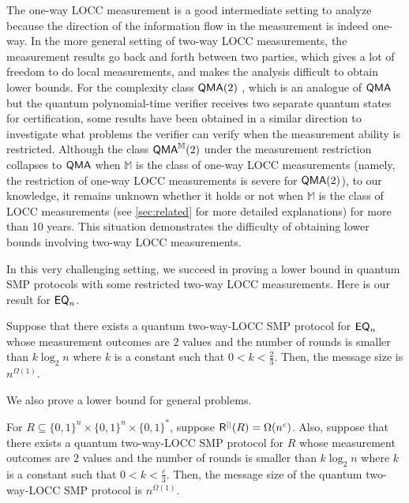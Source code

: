 The one-way LOCC measurement is a good intermediate setting to analyze because the direction of the information flow in the measurement is indeed one-way. In the more general setting of two-way LOCC measurements, the measurement results go back and forth between two parties, which gives a lot of freedom to do local measurements, and makes the analysis difficult to obtain lower bounds. For the complexity class $\mathsf{QMA}(2)$ \cite{KMY03,HM13}, which is an analogue of $\mathsf{QMA}$ but the quantum polynomial-time verifier receives two separate quantum states for certification, some results have been obtained in a similar direction to investigate what problems the verifier can verify when the measurement ability is restricted. Although the class $\mathsf{QMA}^{\mathbb{M}}(2)$ under the measurement restriction collapses to $\mathsf{QMA}$ when $\mathbb{M}$ is the class of one-way LOCC measurements \cite{BCY11,LS15} (namely, the restriction of one-way LOCC measurements is severe for $\mathsf{QMA}(2)$), to our knowledge, it remains unknown whether it holds or not when $\mathbb{M}$ is the class of LOCC measurements (see \cref{sec:related} for more detailed explanations) for more than 10 years. This situation demonstrates the difficulty of obtaining lower bounds involving two-way LOCC measurements.

In this very challenging setting, we succeed in proving a lower bound in quantum SMP protocols with some restricted two-way LOCC measurements. Here is our result for $\mathsf{EQ}_n$.

\begin{theorem}
    Suppose that there exists a quantum two-way-LOCC SMP protocol for $\mathsf{EQ}_n$ whose measurement outcomes are $2$ values and the number of rounds is smaller than $k\log_2 n$ where $k$ is a constant such that $0<k<\frac{2}{3}$. Then, the message size is $n^{\Omega(1)}$.
\end{theorem}

We also prove a lower bound for general problems.

\begin{theorem}
    For $R \subseteq \{0,1\}^n \times \{0,1\}^n \times \{0,1\}^*$, suppose $\mathsf{R}^{||}(R) = \Omega(n^c)$. Also, suppose that there exists a quantum two-way-LOCC SMP protocol for $R$ whose measurement outcomes are $2$ values and the number of rounds is smaller than $k\log_2 n$ where $k$ is a constant such that $0<k<\frac{c}{3}$. Then, the message size of the quantum two-way-LOCC SMP protocol is $n^{\Omega(1)}$.
\end{theorem}

